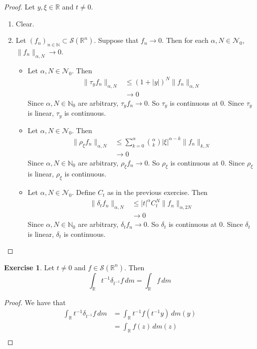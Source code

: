 \documentclass[12pt]{amsart}
\theoremstyle{definition}
\newtheorem{ex}[definition]{Exercise}
\newcommand{\al}{\alpha}
\newcommand{\del}{\delta}
\newcommand{\N}{\mathbb{N}}
\newcommand{\R}{\mathbb{R}}
\newcommand{\MN}{\mathcal{N}}
\newcommand{\MS}{\mathcal{S}}
\newcommand{\dm}{\, d m}
\begin{document}
	\begin{proof} Let $y, \xi \in \R$ and $t \neq 0$.
		\begin{enumerate}
			\item Clear.
			\item Let $(f_n)_{n \in \N} \subset \MS(\R^n)$. Suppose that $f_n \rightarrow 0$. Then for each $\al,N \in \MN_0$, $\|f_n\|_{\al, N} \rightarrow 0$. 
			\begin{itemize}
				\item Let $\al,N \in \MN_0$. Then 
				\begin{align*}
					\|\tau_yf_n\|_{\al, N} 
					& \leq (1 + |y|)^N\|f_n\|_{\al, N} \\
					& \rightarrow 0
				\end{align*}
				Since $\al, N \in \N_0$ are arbitrary, $\tau_yf_n \rightarrow 0$. So $\tau_y$  is continuous at $0$. Since $\tau_y$ is linear, $\tau_y$ is continuous.
				\item Let $\al,N \in \MN_0$. Then 
				\begin{align*}
					\|\rho_{\xi}f_n\|_{\al, N} 
					& \leq \sum\limits_{k=0}^{\al} {\al \choose k} |\xi|^{\al-k} \|f_n\|_{k, N} \\
					& \rightarrow 0
				\end{align*}
				Since $\al, N \in \N_0$ are arbitrary, $\rho_{\xi}f_n \rightarrow 0$. So $\rho_{\xi}$  is continuous at $0$. Since $\rho_{\xi}$ is linear, $\rho_{\xi}$ is continuous.
				\item Let $\al,N \in \MN_0$. Define $C_t$ as in the previous exercise. Then 
				\begin{align*}
					\|\del_t f_n\|_{\al, N} 
					& \leq |t|^{\al} C_t^N \|f_n\|_{\al, 2N} \\
					& \rightarrow 0
				\end{align*}
				Since $\al, N \in \N_0$ are arbitrary, $\del_t f_n \rightarrow 0$. So $\del_t$  is continuous at $0$. Since $\del_t$ is linear, $\del_t$ is continuous.
			\end{itemize} 
		\end{enumerate}
	\end{proof}

	\begin{ex}
		Let $t \neq 0$ and $f \in \MS(\R^n)$. Then 
		$$\int_{\R} t^{-1} \del_{t^{-1}} f \dm  = \int_{\R} f \dm$$
	\end{ex}

	\begin{proof}
		We have that 
		\begin{align*}
			\int_{\R} t^{-1} \del_{t^{-1}} f \dm 
			& = \int_{\R} t^{-1} f(t^{-1} y) \dm(y) \\
			& = \int_{\R}  f(z) \dm(z) \\
		\end{align*}
	\end{proof}
\end{document}

